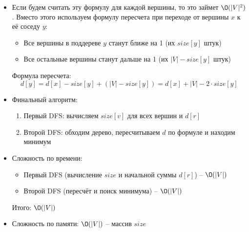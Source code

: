 \begin{enumerate}
\begin{enumerate}
\begin{itemize}
          \item Если будем считать эту формулу для каждой вершины, то это займет $\O(|V|^2)$.
          Вместо этого используем формулу пересчета при переходе от вершины $x$ к её соседу $y$:
          
          \begin{itemize}
            \item Все вершины в поддереве $y$ станут ближе на 1 (их $size[y]$ штук)
            \item Все остальные вершины станут дальше на 1 (их $|V| - size[y]$ штук)
          \end{itemize}
          
          Формула пересчета:
          $$d[y] = d[x] - size[y] + (|V| - size[y]) = d[x] + |V| - 2 \cdot size[y]$$

          \item Финальный алгоритм:
          \begin{enumerate}
            \item Первый DFS: вычисляем $size[v]$ для всех вершин и $d[r]$
            \item Второй DFS: обходим дерево, пересчитываем $d$ по формуле и находим минимум
          \end{enumerate}

          \item Сложность по времени:
          \begin{itemize}
            \item Первый DFS (вычисление $size$ и начальной суммы $d[r]$) -- $\O(|V|)$
            \item Второй DFS (пересчёт и поиск минимума) -- $\O(|V|)$
          \end{itemize}
          
          Итого: $\O(|V|)$
          
          \item Сложность по памяти: $\O(|V|)$ -- массив $size$
        
        \end{itemize}

    \end{enumerate}

\end{enumerate}
